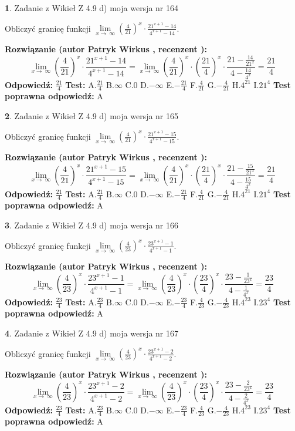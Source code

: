 \documentclass[12pt, a4paper]{article}
\theoremstyle{definition} %
\newtheorem{zad}{}
\newcommand{\zadStart}[1]{\begin{zad}#1\newline}
\newcommand{\zadStop}{\end{zad}}
\newcommand{\rozwStart}[2]{\noindent \textbf{Rozwiązanie (autor #1 , recenzent #2): }\newline}
\newcommand{\rozwStop}{\newline}
\newcommand{\odpStart}{\noindent \textbf{Odpowiedź:}\newline}
\newcommand{\odpStop}{\newline}
\newcommand{\testStart}{\noindent \textbf{Test:}\newline}
\newcommand{\testStop}{\newline}
\newcommand{\kluczStart}{\noindent \textbf{Test poprawna odpowiedź:}\newline}
\newcommand{\kluczStop}{\newline}
\begin{document}
\zadStart{Zadanie z Wikieł Z 4.9 d) moja wersja nr 164}


Obliczyć granicę funkcji  $\lim\limits_{x\to\ \infty}(\frac{4}{21})^{x}\cdot\frac{21^{x+1}-14}{4^{x+1}-14}$.
\zadStop
\rozwStart{Patryk Wirkus}{}
$$\lim\limits_{x\to\ \infty}(\frac{4}{21})^{x}\cdot\frac{21^{x+1}-14}{4^{x+1}-14}=\lim\limits_{x\to\ \infty}(\frac{4}{21})^{x}\cdot(\frac{21}{4})^{x} \cdot \frac{21-\frac{14}{21^{x}}}{4-\frac{14}{4^{x}}} = \frac{21}{4}$$
\rozwStop
\odpStart
$\frac{21}{4}$
\odpStop
\testStart
A.$\frac{21}{4}$ B.$\infty$ C.$0$ D.$-\infty$ E.$-\frac{21}{4}$
F.$\frac{4}{21}$ G.$-\frac{4}{21}$
H.$4^{21}$
I.$21^{4}$
\testStop
\kluczStart
A
\kluczStop



\zadStart{Zadanie z Wikieł Z 4.9 d) moja wersja nr 165}


Obliczyć granicę funkcji  $\lim\limits_{x\to\ \infty}(\frac{4}{21})^{x}\cdot\frac{21^{x+1}-15}{4^{x+1}-15}$.
\zadStop
\rozwStart{Patryk Wirkus}{}
$$\lim\limits_{x\to\ \infty}(\frac{4}{21})^{x}\cdot\frac{21^{x+1}-15}{4^{x+1}-15}=\lim\limits_{x\to\ \infty}(\frac{4}{21})^{x}\cdot(\frac{21}{4})^{x} \cdot \frac{21-\frac{15}{21^{x}}}{4-\frac{15}{4^{x}}} = \frac{21}{4}$$
\rozwStop
\odpStart
$\frac{21}{4}$
\odpStop
\testStart
A.$\frac{21}{4}$ B.$\infty$ C.$0$ D.$-\infty$ E.$-\frac{21}{4}$
F.$\frac{4}{21}$ G.$-\frac{4}{21}$
H.$4^{21}$
I.$21^{4}$
\testStop
\kluczStart
A
\kluczStop



\zadStart{Zadanie z Wikieł Z 4.9 d) moja wersja nr 166}


Obliczyć granicę funkcji  $\lim\limits_{x\to\ \infty}(\frac{4}{23})^{x}\cdot\frac{23^{x+1}-1}{4^{x+1}-1}$.
\zadStop
\rozwStart{Patryk Wirkus}{}
$$\lim\limits_{x\to\ \infty}(\frac{4}{23})^{x}\cdot\frac{23^{x+1}-1}{4^{x+1}-1}=\lim\limits_{x\to\ \infty}(\frac{4}{23})^{x}\cdot(\frac{23}{4})^{x} \cdot \frac{23-\frac{1}{23^{x}}}{4-\frac{1}{4^{x}}} = \frac{23}{4}$$
\rozwStop
\odpStart
$\frac{23}{4}$
\odpStop
\testStart
A.$\frac{23}{4}$ B.$\infty$ C.$0$ D.$-\infty$ E.$-\frac{23}{4}$
F.$\frac{4}{23}$ G.$-\frac{4}{23}$
H.$4^{23}$
I.$23^{4}$
\testStop
\kluczStart
A
\kluczStop



\zadStart{Zadanie z Wikieł Z 4.9 d) moja wersja nr 167}


Obliczyć granicę funkcji  $\lim\limits_{x\to\ \infty}(\frac{4}{23})^{x}\cdot\frac{23^{x+1}-2}{4^{x+1}-2}$.
\zadStop
\rozwStart{Patryk Wirkus}{}
$$\lim\limits_{x\to\ \infty}(\frac{4}{23})^{x}\cdot\frac{23^{x+1}-2}{4^{x+1}-2}=\lim\limits_{x\to\ \infty}(\frac{4}{23})^{x}\cdot(\frac{23}{4})^{x} \cdot \frac{23-\frac{2}{23^{x}}}{4-\frac{2}{4^{x}}} = \frac{23}{4}$$
\rozwStop
\odpStart
$\frac{23}{4}$
\odpStop
\testStart
A.$\frac{23}{4}$ B.$\infty$ C.$0$ D.$-\infty$ E.$-\frac{23}{4}$
F.$\frac{4}{23}$ G.$-\frac{4}{23}$
H.$4^{23}$
I.$23^{4}$
\testStop
\kluczStart
A
\kluczStop
\end{document}
